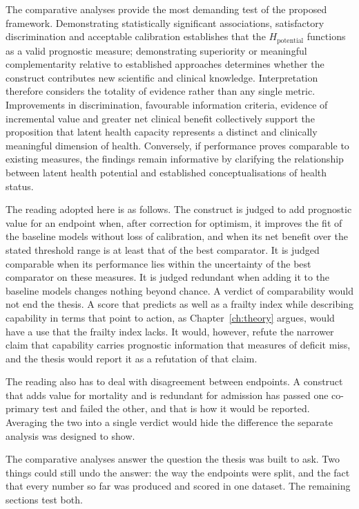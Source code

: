 The comparative analyses provide the most demanding test of the proposed framework. Demonstrating statistically significant associations, satisfactory discrimination and acceptable calibration establishes that the $H_{\text{potential}}$ functions as a valid prognostic measure; demonstrating superiority or meaningful complementarity relative to established approaches determines whether the construct contributes new scientific and clinical knowledge. Interpretation therefore considers the totality of evidence rather than any single metric. Improvements in discrimination, favourable information criteria, evidence of incremental value and greater net clinical benefit collectively support the proposition that latent health capacity represents a distinct and clinically meaningful dimension of health. Conversely, if performance proves comparable to existing measures, the findings remain informative by clarifying the relationship between latent health potential and established conceptualisations of health status.

The reading adopted here is as follows. The construct is judged to add prognostic value for an endpoint when, after correction for optimism, it improves the fit of the baseline models without loss of calibration, and when its net benefit over the stated threshold range is at least that of the best comparator. It is judged comparable when its performance lies within the uncertainty of the best comparator on these measures. It is judged redundant when adding it to the baseline models changes nothing beyond chance. A verdict of comparability would not end the thesis. A score that predicts as well as a frailty index while describing capability in terms that point to action, as Chapter~\ref{ch:theory} argues, would have a use that the frailty index lacks. It would, however, refute the narrower claim that capability carries prognostic information that measures of deficit miss, and the thesis would report it as a refutation of that claim.

The reading also has to deal with disagreement between endpoints. A construct that adds value for mortality and is redundant for admission has passed one co-primary test and failed the other, and that is how it would be reported. Averaging the two into a single verdict would hide the difference the separate analysis was designed to show.

The comparative analyses answer the question the thesis was built to ask. Two things could still undo the answer: the way the endpoints were split, and the fact that every number so far was produced and scored in one dataset. The remaining sections test both.

